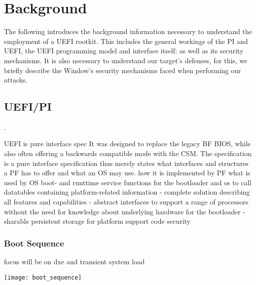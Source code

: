 
\chapter{Background}

The following introduces the background information necessary to understand the employment of a \ac{UEFI} rootkit. This includes the general workings of the \acf{PI} and \ac{UEFI}, the \ac{UEFI} programming model and interface itself; as well as its security mechanisms. It is also necessary to understand our target's defenses, for this, we briefly describe the Window's security mechanisms faced when performing our attacks.

\section{\acs{UEFI}/\acs{PI}}
.

UEFI is pure interface spec
\cite{beyond-bios}
It was designed to replace the legacy \acl{BF} \ac{BIOS}, while also often offering a backwards compatible mode with the \acf{CSM}.
The specification is a pure interface specification thus merely states what interfaces and structures a \ac{PF} has to offer and what an \ac{OS} may use.
how it is implemented by PF
what is used by OS
boot- and runttime service functions for the bootloader and os to call
datatables containing platform-related information
- complete solution describing all features and capabilities
- abstract interfaces to support a range of processors without the need for knowledge about underlying hardware for the bootloader
- sharable persistent storage for platform support code
security

\subsection{Boot Sequence}

focus will be on dxe and transient system load

\texttt{[image: boot\_sequence]}


